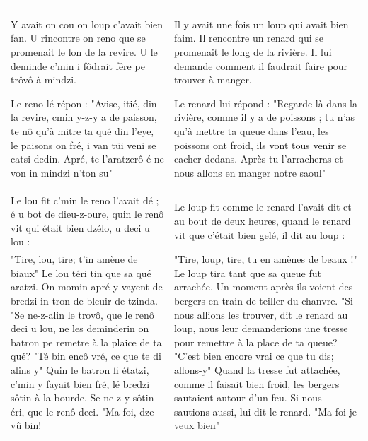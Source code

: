 \clearpage
\begin{center}
\end{center}

{\small
\begin{tabular}{@{}p{}@{\hspace{0.04\textwidth}}p{}@{}}
Y avait on cou on loup c'avait bien fan. U rincontre on reno que se promenait le lon de la revire. U le deminde c'min i fôdrait fêre pe trôvô à mindzi.

Le reno lé répon :
"Avise, itié, din la revire, cmin y-z-y a de paisson, te nô qu'à mitre ta qué din l'eye, le paisons on fré, i van tüi veni se catsi dedin. Apré, te l'aratzerô é ne von in mindzi n'ton su" &
Il y avait une fois un loup qui avait bien faim. Il rencontre un renard qui se promenait le long de la rivière. Il lui demande comment il faudrait faire pour trouver à manger.

Le renard lui répond :
"Regarde là dans la rivière, comme il y a de poissons ; tu n'as qu'à mettre ta queue dans l'eau, les poissons ont froid, ils vont tous venir se cacher dedans. Après tu l'arracheras et nous allons en manger notre saoul" \\

Le lou fit c'min le reno l'avait dé ; é u bot de dieu-z-oure, quin le renô vit qui était bien dzélo, u deci u lou : &
Le loup fit comme le renard l'avait dit et au bout de deux heures, quand le renard vit que c'était bien gelé, il dit au loup : \\

"Tire, lou, tire; t'in amène de biaux"
Le lou téri tin que sa qué aratzi.
On momin apré y vayent de bredzi in tron de bleuir de tzinda.
"Se ne-z-alin le trovô, que le renô deci u lou, ne les deminderin on batron pe remetre à la plaice de ta qué?
"Té bin encô vré, ce que te di alins y"
Quin le batron fi étatzi, c'min y fayait bien fré, lé bredzi sôtin à la bourde.
Se ne z-y sôtin éri, que le renô deci.
"Ma foi, dze vû bin! &
"Tire, loup, tire, tu en amènes de beaux !"
Le loup tira tant que sa queue fut arrachée.
Un moment après ils voient des bergers en train de teiller du chanvre.
"Si nous allions les trouver, dit le renard au loup, nous leur demanderions une tresse pour remettre à la place de ta queue?
"C'est bien encore vrai ce que tu dis; allons-y"
Quand la tresse fut attachée, comme il faisait bien froid, les bergers sautaient autour d'un feu.
Si nous sautions aussi, lui dit le renard.
"Ma foi je veux bien" \\


\end{tabular}}
